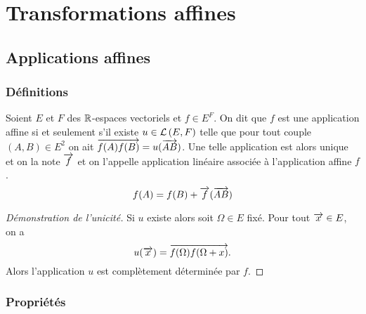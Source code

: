 \chapter{Transformations affines}
\label{chap:transformationsaffines}
\minitoc
\minilof
\minilot

\section{Applications affines}

\subsection{Définitions}

Soient $E$ et $F$ des $\mathbb{R}$-espaces vectoriels et $f\in E^F$. On dit que $f$ est une application affine si et seulement s'il existe $u \in \mathcal{L}\left(E,F\right)$ telle que pour tout couple $(A,B) \in E^2$ on ait $\overrightarrow{f(A)f(B)}=u(\overrightarrow{AB})$. Une telle application est alors unique et on la note $\overrightarrow{f}$ et on l'appelle application linéaire associée à l'application affine $f$.
\begin{equation}
  f(A)=f(B)+ \overrightarrow{f}(\overrightarrow{AB})
\end{equation}
\begin{proof}[Démonstration de l'unicité]
  Si $u$ existe alors soit $\Omega \in E$ fixé. Pour tout $\overrightarrow{x} \in E$, on a
  \begin{equation}
    u(\overrightarrow{x})=\overrightarrow{f(\Omega)f(\Omega+x)}.
  \end{equation}
  Alors l'application $u$ est complètement déterminée par $f$.
\end{proof}

\subsection{Propriétés}

